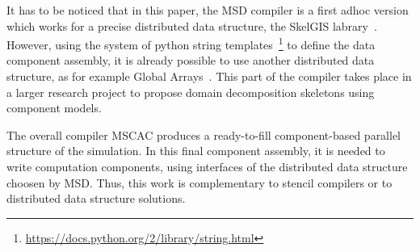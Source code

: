 It has to be noticed that in this paper, the MSD compiler is a first adhoc version which works for a precise distributed data structure, the SkelGIS labrary~\cite{HeleneLS13,HeleneLS14,HeleneEuroPar14,CPE:CPE3494}. However, using the system of python string templates~\footnote{\url{https://docs.python.org/2/library/string.html}} to define the data component assembly, it is already possible to use another distributed data structure, as for example Global Arrays~\cite{Nieplocha:2006:AAP:1125980.1125985}. This part of the compiler takes place in a larger research project to propose domain decomposition skeletons using component models.

The overall compiler MSCAC produces a ready-to-fill component-based parallel structure of the simulation. In this final component assembly, it is needed to write computation components, using interfaces of the distributed data structure choosen by MSD. Thus, this work is complementary to stencil compilers or to distributed data structure solutions.